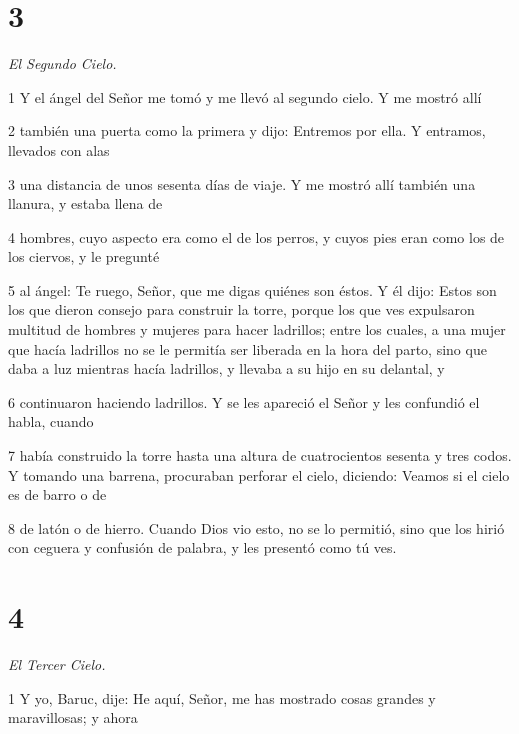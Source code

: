 \chapter{3}

\par \textit{El Segundo Cielo.}

\par 1 Y el ángel del Señor me tomó y me llevó al segundo cielo. Y me mostró allí

\par 2 también una puerta como la primera y dijo: Entremos por ella. Y entramos, llevados con alas

\par 3 una distancia de unos sesenta días de viaje. Y me mostró allí también una llanura, y estaba llena de

\par 4 hombres, cuyo aspecto era como el de los perros, y cuyos pies eran como los de los ciervos, y le pregunté

\par 5 al ángel: Te ruego, Señor, que me digas quiénes son éstos. Y él dijo: Estos son los que dieron consejo para construir la torre, porque los que ves expulsaron multitud de hombres y mujeres para hacer ladrillos; entre los cuales, a una mujer que hacía ladrillos no se le permitía ser liberada en la hora del parto, sino que daba a luz mientras hacía ladrillos, y llevaba a su hijo en su delantal, y

\par 6 continuaron haciendo ladrillos. Y se les apareció el Señor y les confundió el habla, cuando

\par 7 había construido la torre hasta una altura de cuatrocientos sesenta y tres codos. Y tomando una barrena, procuraban perforar el cielo, diciendo: Veamos si el cielo es de barro o de

\par 8 de latón o de hierro. Cuando Dios vio esto, no se lo permitió, sino que los hirió con ceguera y confusión de palabra, y les presentó como tú ves.

\chapter{4}

\par \textit{El Tercer Cielo.}

\par 1 Y yo, Baruc, dije: He aquí, Señor, me has mostrado cosas grandes y maravillosas; y ahora

